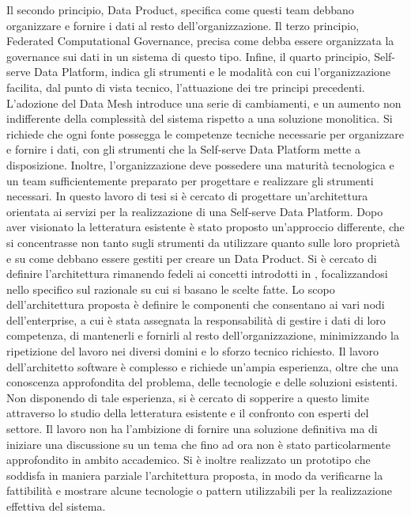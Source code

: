 \documentclass[a4paper,12pt]{report}
\begin{document}
Il secondo principio, Data Product, specifica come questi team debbano organizzare e fornire i dati al resto dell'organizzazione.
Il terzo principio, Federated Computational Governance, precisa come debba essere organizzata la governance sui dati in un sistema di questo tipo.
Infine, il quarto principio, Self-serve Data Platform, indica gli strumenti e le modalità con cui l'organizzazione facilita, dal punto di vista tecnico, l'attuazione dei tre principi precedenti.
L'adozione del Data Mesh introduce una serie di cambiamenti, e un aumento non indifferente della complessità del sistema rispetto a una soluzione monolitica.
Si richiede che ogni fonte possegga le competenze tecniche necessarie per organizzare e fornire i dati, con gli strumenti che la Self-serve Data Platform mette a disposizione.
Inoltre, l'organizzazione deve possedere una maturità tecnologica e un team sufficientemente preparato per progettare e realizzare gli strumenti necessari.
In questo lavoro di tesi si è cercato di progettare un'architettura orientata ai servizi per la realizzazione di una Self-serve Data Platform.
Dopo aver visionato la letteratura esistente è stato proposto un'approccio differente, che si concentrasse non tanto sugli strumenti da utilizzare quanto sulle loro proprietà e su come debbano essere gestiti per creare un Data Product.
Si è cercato di definire l'architettura rimanendo fedeli ai concetti introdotti in \cite{perry_foundations_1992}, focalizzandosi nello specifico sul razionale su cui si basano le scelte fatte.
Lo scopo dell'architettura proposta è definire le componenti che consentano ai vari nodi dell'enterprise, a cui è stata assegnata la responsabilità di gestire i dati di loro competenza, di mantenerli e fornirli al resto dell'organizzazione, minimizzando la ripetizione del lavoro nei diversi domini e lo sforzo tecnico richiesto. 
Il lavoro dell'architetto software è complesso e richiede un'ampia esperienza, oltre che una conoscenza approfondita del problema, delle tecnologie e delle soluzioni esistenti.
Non disponendo di tale esperienza, si è cercato di sopperire a questo limite attraverso lo studio della letteratura esistente e il confronto con esperti del settore.
Il lavoro non ha l'ambizione di fornire una soluzione definitiva ma di iniziare una discussione su un tema che fino ad ora non è stato particolarmente approfondito in ambito accademico.
Si è inoltre realizzato un prototipo che soddisfa in maniera parziale l'architettura proposta, in modo da verificarne la fattibilità e mostrare alcune tecnologie o pattern utilizzabili per la realizzazione effettiva del sistema.
\end{document}
